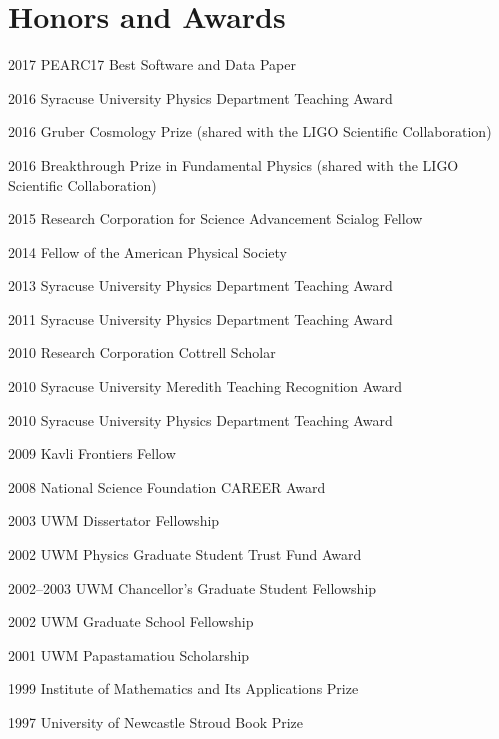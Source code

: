 \documentclass{cv}
\begin{document}

\vspace*{-0.5cm}
\section{Honors and Awards}
\begin{entry}
  \item[{2017}] PEARC17 Best Software and Data Paper
  \item[{2016}] Syracuse University Physics Department Teaching Award
  \item[{2016}] Gruber Cosmology Prize (shared with the LIGO Scientific Collaboration)
  \item[{2016}] Breakthrough Prize in Fundamental Physics (shared with the LIGO Scientific Collaboration)
  \item[{2015}] Research Corporation for Science Advancement Scialog Fellow
  \item[{2014}] Fellow of the American Physical Society
  \item[{2013}] Syracuse University Physics Department Teaching Award
  \item[{2011}] Syracuse University Physics Department Teaching Award
  \item[{2010}] Research Corporation Cottrell Scholar
  \item[{2010}] Syracuse University Meredith Teaching Recognition Award
  \item[{2010}] Syracuse University Physics Department Teaching Award
  \item[{2009}] Kavli Frontiers Fellow
  \item[{2008}] National Science Foundation CAREER Award
  \item[{2003}] UWM Dissertator Fellowship
  \item[{2002}] UWM Physics Graduate Student Trust Fund Award
  \item[{2002--2003}] UWM Chancellor's Graduate Student Fellowship
  \item[{2002}] UWM Graduate School Fellowship
  \item[{2001}] UWM Papastamatiou Scholarship
  \item[{1999}] Institute of Mathematics and Its Applications Prize
  \item[{1997}] University of Newcastle Stroud Book Prize
\end{entry}

\vspace*{-0.5cm}
\end{document}

